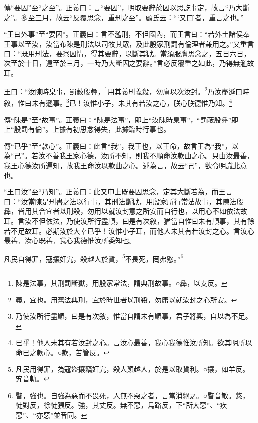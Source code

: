{\noindent\zhuan{}\fzbyks 傳“要囚”至“之至”。正義曰：言“要囚”，明取要辭於囚以思訖事定，故言“乃大斷之”。多至三月，故云“反覆思念，重刑之至”。顧氏云：“‘又曰’者，重言之也。” \par}

{\noindent\shu{}\fzkt “王曰外事”至“要囚”。正義曰：言不濫刑，不但國內，而王言曰：“若外土諸侯奉王事以至汝，汝當布陳是刑法以司牧其眾，及此殷家刑罰有倫理者兼用之。”又重言曰：“既用刑法，要察囚情，得其要辭，以斷其獄。當須服膺思念之，五日六日，次至於十日，遠至於三月，一時乃大斷囚之要辭。”言必反覆重之如此，乃得無濫故耳。 \par}

王曰：“汝陳時臬事，罰蔽殷彝，\footnote{陳是法事，其刑罰斷獄，用殷家常法，謂典刑故事。○彝，以支反。}用其義刑義殺，勿庸以次汝封。\footnote{義，宜也。用舊法典刑，宜於時世者以刑殺，勿庸以就汝封之心所安。}乃汝盡遜曰時敘，惟曰未有遜事。\footnote{乃使汝所行盡順，曰是有次敘，惟當自謂未有順事，君子將興，自以為不足。}已！汝惟小子，未其有若汝之心，朕心朕德惟乃知。\footnote{已乎！他人未其有若汝封之心。言汝心最善，我心我德惟汝所知。欲其明所以命已之款心。○款，苦管反。}


{\noindent\zhuan{}\fzbyks 傳“陳是”至“故事”。正義曰：“陳是法事”，即上“汝陳時臬事”，“罰蔽殷彝”即上“殷罰有倫”。上據有初思念得失，此據臨時行事也。 \par}

{\noindent\zhuan{}\fzbyks 傳“已乎”至“款心”。正義曰：此言“我”，我王也，以王命，故言王為“我”，以為“己”。若汝不善我王家心德，汝所不知，則我不順命汝款曲之心。只由汝最善，我王心德汝所遍知，故我王命汝以款曲之心。述為言，故云“己”，欲令明識此意也。 \par}

{\noindent\shu{}\fzkt “王曰汝”至“乃知”。正義曰：此又申上既要囚思念，定其大斷若為，而王言曰：“汝當陳是刑書之法以行事，其刑法斷獄，用殷家所行常法故事，其陳法殷彝，皆用其合宜者以刑殺，勿用以就汝封意之所安而自行也，以用心不如依法故耳。言汝不但依法，乃使汝所行盡順，曰是有次敘，猶當自惟曰未有順事，其有餘若不足故耳。必期汝於大幸已乎！汝惟小子耳，而他人未其有若汝封之心。言汝心最善，汝心既善，我心我德惟汝所委知也。 \par}

凡民自得罪，寇攘奸宄，殺越人於貨，\footnote{凡民用得罪，為寇盜攘竊奸宄，殺人顛越人，於是以取貨利。○攘，如羊反。宄音軌。}不畏死，罔弗憝。”\footnote{暋，強也。自強為惡而不畏死，人無不惡之者，言當消絕之。○暋音敏。憝，徒對反，徐徒猥反。強，其丈反。無不惡，烏路反，下“所大惡”、“疾惡”、“亦惡”並音同。}


